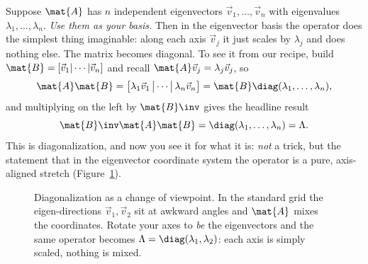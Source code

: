 Suppose $\mat{A}$ has $n$ independent eigenvectors $\vec{v}_1,\dots,\vec{v}_n$ with
eigenvalues $\lambda_1,\dots,\lambda_n$. \emph{Use them as your basis.} Then in the
eigenvector basis the operator does the simplest thing imaginable: along each axis
$\vec{v}_j$ it just scales by $\lambda_j$ and does nothing else. The matrix
becomes diagonal. To see it from our recipe, build $\mat{B}=[\vec{v}_1|\cdots|\vec{v}_n]$
and recall $\mat{A}\vec{v}_j=\lambda_j\vec{v}_j$, so
\[
  \mat{A}\mat{B} = \big[\lambda_1\vec{v}_1\,\big|\cdots\big|\,\lambda_n\vec{v}_n\big]
  = \mat{B}\diag(\lambda_1,\dots,\lambda_n),
\]
and multiplying on the left by $\mat{B}\inv$ gives the headline result
\[
  \mat{B}\inv\mat{A}\mat{B} = \diag(\lambda_1,\dots,\lambda_n) = \Lambda.
\]
This is diagonalization, and now you see it for what it is: \emph{not} a trick, but
the statement that in the eigenvector coordinate system the operator is a pure,
axis-aligned stretch (Figure~\ref{ch31:fig-eigenstretch}).

\begin{figure}[H]
\centering
{}
\caption{Diagonalization as a change of viewpoint. In the standard grid the
eigen-directions $\vec{v}_1,\vec{v}_2$ sit at awkward angles and $\mat{A}$ mixes
the coordinates. Rotate your axes to \emph{be} the eigenvectors and the same
operator becomes $\Lambda=\diag(\lambda_1,\lambda_2)$: each axis is simply scaled,
nothing is mixed.}
\label{ch31:fig-eigenstretch}
\end{figure}

